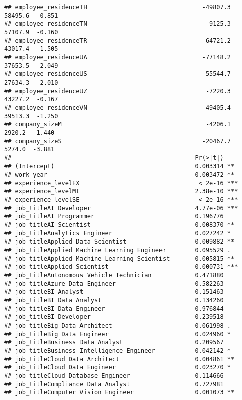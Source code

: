 \documentclass[
]{article}
\begin{document}
\begin{verbatim}
## employee_residenceTH                                -49807.3    58495.6  -0.851
## employee_residenceTN                                 -9125.3    57107.9  -0.160
## employee_residenceTR                                -64721.2    43017.4  -1.505
## employee_residenceUA                                -77148.2    37653.5  -2.049
## employee_residenceUS                                 55544.7    27634.3   2.010
## employee_residenceUZ                                 -7220.3    43227.2  -0.167
## employee_residenceVN                                -49405.4    39513.3  -1.250
## company_sizeM                                        -4206.1     2920.2  -1.440
## company_sizeS                                       -20467.7     5274.0  -3.881
##                                                   Pr(>|t|)    
## (Intercept)                                       0.003314 ** 
## work_year                                         0.003472 ** 
## experience_levelEX                                 < 2e-16 ***
## experience_levelMI                                2.38e-10 ***
## experience_levelSE                                 < 2e-16 ***
## job_titleAI Developer                             4.77e-06 ***
## job_titleAI Programmer                            0.196776    
## job_titleAI Scientist                             0.008370 ** 
## job_titleAnalytics Engineer                       0.027242 *  
## job_titleApplied Data Scientist                   0.009882 ** 
## job_titleApplied Machine Learning Engineer        0.095529 .  
## job_titleApplied Machine Learning Scientist       0.005815 ** 
## job_titleApplied Scientist                        0.000731 ***
## job_titleAutonomous Vehicle Technician            0.471880    
## job_titleAzure Data Engineer                      0.582263    
## job_titleBI Analyst                               0.151463    
## job_titleBI Data Analyst                          0.134260    
## job_titleBI Data Engineer                         0.976844    
## job_titleBI Developer                             0.239518    
## job_titleBig Data Architect                       0.061998 .  
## job_titleBig Data Engineer                        0.024960 *  
## job_titleBusiness Data Analyst                    0.209567    
## job_titleBusiness Intelligence Engineer           0.042142 *  
## job_titleCloud Data Architect                     0.004861 ** 
## job_titleCloud Data Engineer                      0.023270 *  
## job_titleCloud Database Engineer                  0.114666    
## job_titleCompliance Data Analyst                  0.727981    
## job_titleComputer Vision Engineer                 0.001073 ** 

\end{verbatim}
\end{document}
